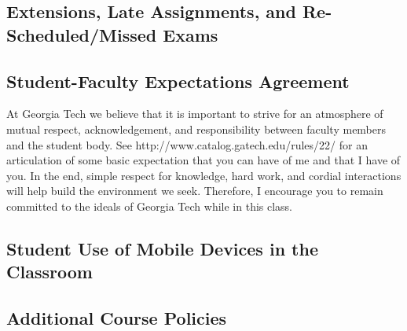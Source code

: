 \documentclass[10pt]{article}
\begin{document}
\subsection*{Extensions, Late Assignments, and Re-Scheduled/Missed Exams}
%
\subsection*{Student-Faculty Expectations Agreement}
At Georgia Tech we believe that it is important to strive for an atmosphere of mutual respect, acknowledgement, and responsibility between faculty members and the student body. See http://www.catalog.gatech.edu/rules/22/ for an articulation of some basic expectation that you can have of me and that I have of you. In the end, simple respect for knowledge, hard work, and cordial interactions will help build the environment we seek. Therefore, I encourage you to remain committed to the ideals of Georgia Tech while in this class.
%
\subsection*{Student Use of Mobile Devices in the Classroom}
%
\subsection*{Additional Course Policies}
\end{document}
